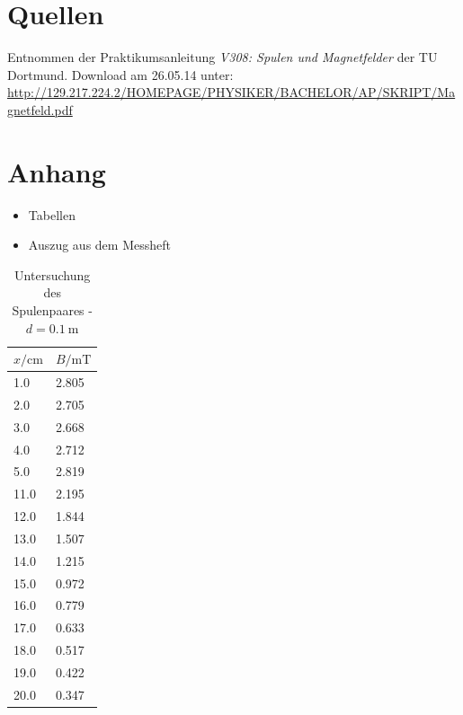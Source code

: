 \documentclass[11pt,ngerman,a4paper]{article}
\begin{document}
\section{Quellen}
\begin{enumerate}[{[}1{]}]
\item Entnommen der Praktikumsanleitung \textit{V308: Spulen und Magnetfelder} der TU Dortmund. Download am 26.05.14 unter:\\
 \url{http://129.217.224.2/HOMEPAGE/PHYSIKER/BACHELOR/AP/SKRIPT/Magnetfeld.pdf}
\end{enumerate}

\section{Anhang}
\begin{itemize}
\item Tabellen
\item Auszug aus dem Messheft
\end{itemize}
\newpage

\begin{table}[H]
\centering
\begin{tabular}{ll}
\toprule
{$x / \si{\centi\meter}$} &{ $B/\si{\milli\tesla}$ }\\
\midrule
1.0 & 2.805\\
2.0 & 2.705\\
3.0 & 2.668\\
4.0 & 2.712\\
5.0 & 2.819\\
11.0 & 2.195\\
12.0 & 1.844\\
13.0 & 1.507\\
14.0 & 1.215\\
15.0 & 0.972\\
16.0 & 0.779\\
17.0 & 0.633\\
18.0 & 0.517\\
19.0 & 0.422\\
20.0 & 0.347\\
\bottomrule
\end{tabular}
\label{}
\caption{Untersuchung des Spulenpaares - $d =\SI{0.1}{\meter}$}
\end{table}
\end{document}
